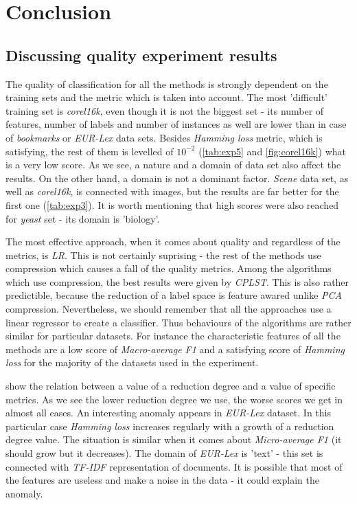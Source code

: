 \chapter{Conclusion}

\section{Discussing quality experiment results}

The quality of classification for all the methods is strongly dependent on the training sets and the metric which is taken into account. The most 'difficult' training set is \textit{corel16k}, even though it is not the biggest set - its number of features, number of labels and number of instances as well are lower than in case of \textit{bookmarks} or \textit{EUR-Lex} data sets. Besides \textit{Hamming loss} metric, which is satisfying, the rest of them is levelled of $10^{-2}$ (\cref{tab:exp5} and \cref{fig:corel16k}) what is a very low score. As we see, a nature and a domain of data set also affect the results. On the other hand, a domain is not a dominant factor. \textit{Scene} data set, as well as \textit{corel16k}, is connected with images, but the results are far better for the first one (\cref{tab:exp3}). It is worth mentioning that high scores were also reached for \textit{yeast} set - its domain is 'biology'.

The most effective approach, when it comes about quality and regardless of the metrics, is \textit{LR}. This is not certainly suprising - the rest of the methods use compression which causes a fall of the quality metrics. Among the algorithms which use compression, the best results were given by \textit{CPLST}. This is also rather predictible, because the reduction of a label space is feature awared unlike \textit{PCA} compression. Nevertheless, we should remember that all the approaches use a linear regressor to create a classifier. Thus behaviours of the algorithms are rather similar for particular datasets. For instance the characteristic features of all the methods are a low score of \textit{Macro-average F1} and a satisfying score of \textit{Hamming loss} for the majority of the datasets used in the experiment. 

 show the relation between a value of a reduction degree and a value of specific metrics. As we see the lower reduction degree we use, the worse scores we get in almost all cases. An interesting anomaly appears in \textit{EUR-Lex} dataset. In this particular case \textit{Hamming loss} increases regularly with a growth of a reduction degree value. The situation is similar when it comes about \textit{Micro-average F1} (it should grow but it decreases). The domain of \textit{EUR-Lex} is 'text' - this set is connected with \textit{TF-IDF} representation of documents. It is possible that most of the features are useless and make a noise in the data - it could explain the anomaly.  

